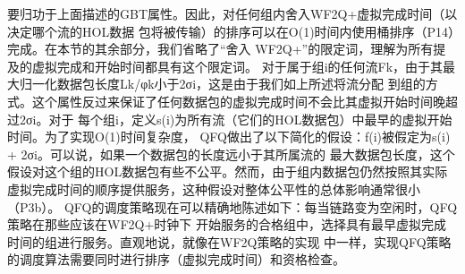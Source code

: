 要归功于上面描述的GBT属性。因此，对任何组内舍入WF2Q+虚拟完成时间（以决定哪个流的HOL数据
包将被传输）的排序可以在O(1)时间内使用桶排序（P14）完成。在本节的其余部分，我们省略了“舍入
WF2Q+”的限定词，理解为所有提及的虚拟完成和开始时间都具有这个限定词。
对于属于组i的任何流Fk，由于其最大归一化数据包长度Lk/φk小于2σi，这是由于我们如上所述将流分配
到组的方式。这个属性反过来保证了任何数据包的虚拟完成时间不会比其虚拟开始时间晚超过2σi。对于
每个组i，定义s(i)为所有流（它们的HOL数据包）中最早的虚拟开始时间。为了实现O(1)时间复杂度，
QFQ做出了以下简化的假设：f(i)被假定为s(i) + 2σi。可以说，如果一个数据包的长度远小于其所属流的
最大数据包长度，这个假设对这个组的HOL数据包有些不公平。然而，由于组内数据包仍然按照其实际
虚拟完成时间的顺序提供服务，这种假设对整体公平性的总体影响通常很小（P3b）。
QFQ的调度策略现在可以精确地陈述如下：每当链路变为空闲时，QFQ策略在那些应该在WF2Q+时钟下
开始服务的合格组中，选择具有最早虚拟完成时间的组进行服务。直观地说，就像在WF2Q策略的实现
中一样，实现QFQ策略的调度算法需要同时进行排序（虚拟完成时间）和资格检查。

